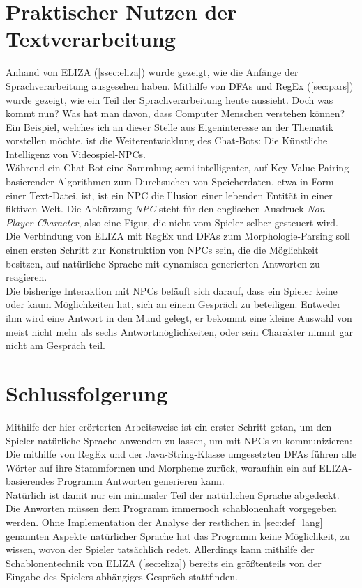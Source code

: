 \documentclass[12pt,twoside]{article}
\theoremstyle{plain}
\theoremstyle{definition}
\theoremstyle{remark}
\begin{document}
\section{Praktischer Nutzen der Textverarbeitung}
\label{sec:ausb}
Anhand von ELIZA (\ref{ssec:eliza}) wurde gezeigt, wie die Anfänge der Sprachverarbeitung ausgesehen haben.
Mithilfe von DFAs und RegEx (\ref{sec:pars}) wurde gezeigt, wie ein Teil der Sprachverarbeitung heute aussieht.
Doch was kommt nun?
Was hat man davon, dass Computer Menschen verstehen können?
Ein Beispiel, welches ich an dieser Stelle aus Eigeninteresse an der Thematik vorstellen möchte, ist die Weiterentwicklung des Chat-Bots: Die Künstliche Intelligenz von Videospiel-NPCs.\\
Während ein Chat-Bot eine Sammlung semi-intelligenter, auf Key-Value-Pairing basierender Algorithmen zum Durchsuchen von Speicherdaten, etwa in Form einer Text-Datei, ist, ist ein NPC die Illusion einer lebenden Entität in einer fiktiven Welt.
Die Abkürzung \textit{NPC} steht für den englischen Ausdruck \textit{Non-Player-Character}, also eine Figur, die nicht vom Spieler selber gesteuert wird.\\
Die Verbindung von ELIZA mit RegEx und DFAs zum Morphologie-Parsing soll einen ersten Schritt zur Konstruktion von NPCs sein, die die Möglichkeit besitzen, auf natürliche Sprache mit dynamisch generierten Antworten zu reagieren.\\
Die bisherige Interaktion mit NPCs beläuft sich darauf, dass ein Spieler keine oder kaum Möglichkeiten hat, sich an einem Gespräch zu beteiligen.
Entweder ihm wird eine Antwort in den Mund gelegt, er bekommt eine kleine Auswahl von meist nicht mehr als sechs Antwortmöglichkeiten, oder sein Charakter nimmt gar nicht am Gespräch teil.
\section{Schlussfolgerung}
\label{sec:concl}
Mithilfe der hier erörterten Arbeitsweise ist ein erster Schritt getan, um den Spieler natürliche Sprache anwenden zu lassen, um mit NPCs zu kommunizieren:\\
Die mithilfe von RegEx und der Java-String-Klasse umgesetzten DFAs führen alle Wörter auf ihre Stammformen und Morpheme zurück, woraufhin ein auf ELIZA-basierendes Programm Antworten generieren kann.\\
Natürlich ist damit nur ein minimaler Teil der natürlichen Sprache abgedeckt.
Die Anworten müssen dem Programm immernoch schablonenhaft vorgegeben werden.
Ohne Implementation der Analyse der restlichen in \ref{sec:def_lang} genannten Aspekte natürlicher Sprache hat das Programm keine Möglichkeit, zu wissen, wovon der Spieler tatsächlich redet.
Allerdings kann mithilfe der Schablonentechnik von ELIZA (\ref{sec:eliza}) bereits ein größtenteils von der Eingabe des Spielers abhängiges Gespräch stattfinden.
 



%
%
\newpage


\nocite{*}
\end{document}
